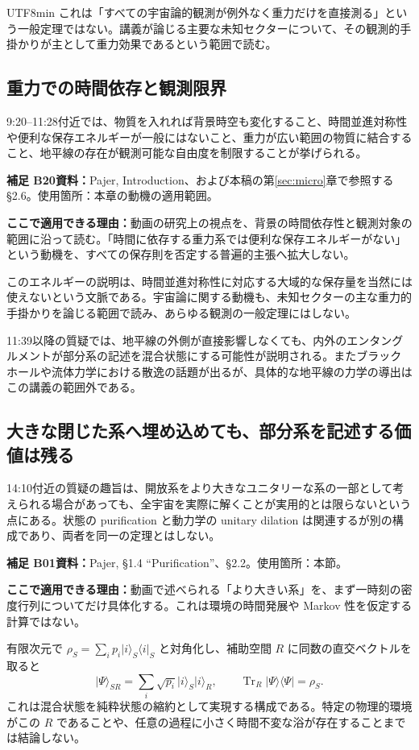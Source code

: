 \documentclass[11pt,a4paper]{article}
\numberwithin{equation}{section}
\newcommand{\Tr}{\operatorname{Tr}}
\newcommand{\ket}[1]{\lvert#1\rangle}
\newcommand{\bra}[1]{\langle#1\rvert}
\newcommand{\supp}[3]{\par\smallskip\noindent\textcolor{BrickRed}{\textbf{補足 #1}}\quad\textbf{資料：}#2\par\noindent\textbf{ここで適用できる理由：}#3\par}
\begin{document}
\begin{CJK*}{UTF8}{min}
これは「すべての宇宙論的観測が例外なく重力だけを直接測る」という一般定理ではない。講義が論じる主要な未知セクターについて、その観測的手掛かりが主として重力効果であるという範囲で読む。

\subsection{重力での時間依存と観測限界}
9:20--11:28付近では、物質を入れれば背景時空も変化すること、時間並進対称性や便利な保存エネルギーが一般にはないこと、重力が広い範囲の物質に結合すること、地平線の存在が観測可能な自由度を制限することが挙げられる。

\supp{B20}{Pajer\cite{pajer}, Introduction、および本稿の第\ref{sec:micro}章で参照する §2.6。使用箇所：本章の動機の適用範囲。}{動画の研究上の視点を、背景の時間依存性と観測対象の範囲に沿って読む。「時間に依存する重力系では便利な保存エネルギーがない」という動機を、すべての保存則を否定する普遍的主張へ拡大しない。}
このエネルギーの説明は、時間並進対称性に対応する大域的な保存量を当然には使えないという文脈である。宇宙論に関する動機も、未知セクターの主な重力的手掛かりを論じる範囲で読み、あらゆる観測の一般定理にはしない。

11:39以降の質疑では、地平線の外側が直接影響しなくても、内外のエンタングルメントが部分系の記述を混合状態にする可能性が説明される。またブラックホールや流体力学における散逸の話題が出るが、具体的な地平線の力学の導出はこの講義の範囲外である。

\subsection{大きな閉じた系へ埋め込めても、部分系を記述する価値は残る}
14:10付近の質疑の趣旨は、開放系をより大きなユニタリーな系の一部として考えられる場合があっても、全宇宙を実際に解くことが実用的とは限らないという点にある。状態の purification と動力学の unitary dilation は関連するが別の構成であり、両者を同一の定理とはしない。

\supp{B01}{Pajer\cite{pajer}, §1.4 ``Purification''、§2.2。使用箇所：本節。}{動画で述べられる「より大きい系」を、まず一時刻の密度行列についてだけ具体化する。これは環境の時間発展や Markov 性を仮定する計算ではない。}
有限次元で $\rho_S=\sum_i p_i\ket{i}_S\bra{i}_S$ と対角化し、補助空間 $R$ に同数の直交ベクトルを取ると
\begin{equation}
\ket{\Psi}_{SR}=\sum_i\sqrt{p_i}\ket{i}_S\ket{i}_R,
\qquad \Tr_R\ket{\Psi}\bra{\Psi}=\rho_S.
\label{eq:purification}
\end{equation}
これは混合状態を純粋状態の縮約として実現する構成である。特定の物理的環境がこの $R$ であることや、任意の過程に小さく時間不変な浴が存在することまでは結論しない。


\end{CJK*}
\end{document}
